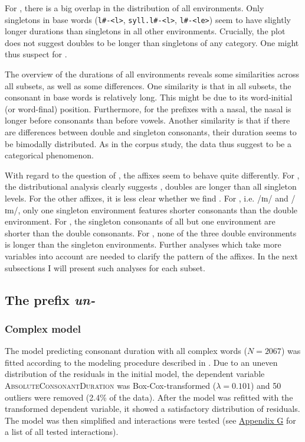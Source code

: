 
For , there is a big overlap in the distribution of all environments. Only singletons in base words (\texttt{l\#-<l>}, \texttt{syll.l\#-<l>}, \texttt{l\#-<le>}) seem to have slightly longer durations than singletons in all other environments. Crucially, the plot does not suggest doubles to be longer than singletons of any category. One might thus suspect  for . 

The overview of the durations of all environments reveals some similarities across all subsets, as well as some differences. 
One similarity is that in all subsets, the consonant in base words is relatively long. This might be due to its word-initial (or word-final) position. 
Furthermore, for the prefixes with a nasal, the nasal is longer before consonants than before vowels. 
Another similarity is that if there are differences between double and singleton consonants, their duration seems to be bimodally distributed. As in the corpus study, the data thus suggest  to be a categorical phenomenon.

With regard to the question of , the affixes seem to behave quite differently. For , the distributional analysis clearly suggests , doubles are longer than all singleton levels. 
For the other affixes, it is less clear whether we find . For , i.e. /ɪn/ and /ɪm/, only one singleton environment features shorter consonants than the double environment.
For , the singleton consonants of all but one environment are shorter than the double consonants. 
For , none of the three double environments is longer than the singleton environments. Further analyses which take more variables into account are needed to clarify the  pattern of the affixes. 
 In the next subsections I will present such analyses for each subset.


\subsection{The prefix \textit{un-}} \label{un experiment}

\subsubsection{Complex model}


The model predicting consonant duration with all complex words ($N=2067$) was fitted according to the modeling procedure described in . Due to an uneven distribution of the residuals in the initial model, the dependent variable \textsc{AbsoluteConsonantDuration} was Box-Cox-transformed ($\lambda = 0.101$) and 50 outliers were removed (2.4\% of the data).
 After the model was refitted with the transformed dependent variable, it showed a satisfactory distribution of residuals.  The model was then simplified and interactions were tested (see \hyperref[Appendix G Summaries of tested interactions in experimental study]{Appendix G} for a list of all tested interactions).
 
